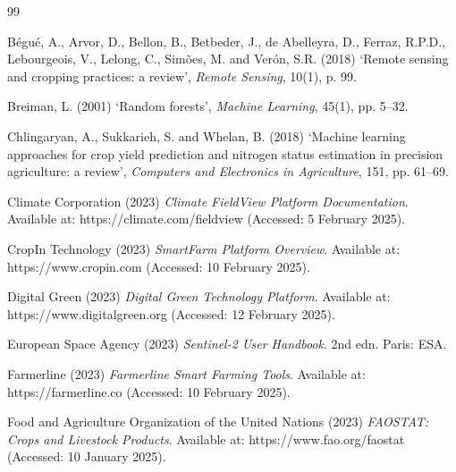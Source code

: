 \documentclass[12pt,a4paper]{report}
\begin{document}
\begin{thebibliography}{99}

Bégué, A., Arvor, D., Bellon, B., Betbeder, J., de Abelleyra, D., Ferraz, R.P.D., Lebourgeois, V., Lelong, C., Simões, M. and Verón, S.R. (2018) `Remote sensing and cropping practices: a review', \textit{Remote Sensing}, 10(1), p. 99.

Breiman, L. (2001) `Random forests', \textit{Machine Learning}, 45(1), pp. 5--32.

Chlingaryan, A., Sukkarieh, S. and Whelan, B. (2018) `Machine learning approaches for crop yield prediction and nitrogen status estimation in precision agriculture: a review', \textit{Computers and Electronics in Agriculture}, 151, pp. 61--69.

Climate Corporation (2023) \textit{Climate FieldView Platform Documentation}. Available at: https://climate.com/fieldview (Accessed: 5 February 2025).

CropIn Technology (2023) \textit{SmartFarm Platform Overview}. Available at: https://www.cropin.com (Accessed: 10 February 2025).

Digital Green (2023) \textit{Digital Green Technology Platform}. Available at: https://www.digitalgreen.org (Accessed: 12 February 2025).

European Space Agency (2023) \textit{Sentinel-2 User Handbook}. 2nd edn. Paris: ESA.

Farmerline (2023) \textit{Farmerline Smart Farming Tools}. Available at: https://farmerline.co (Accessed: 10 February 2025).

Food and Agriculture Organization of the United Nations (2023) \textit{FAOSTAT: Crops and Livestock Products}. Available at: https://www.fao.org/faostat (Accessed: 10 January 2025).


\end{thebibliography}
\end{document}
